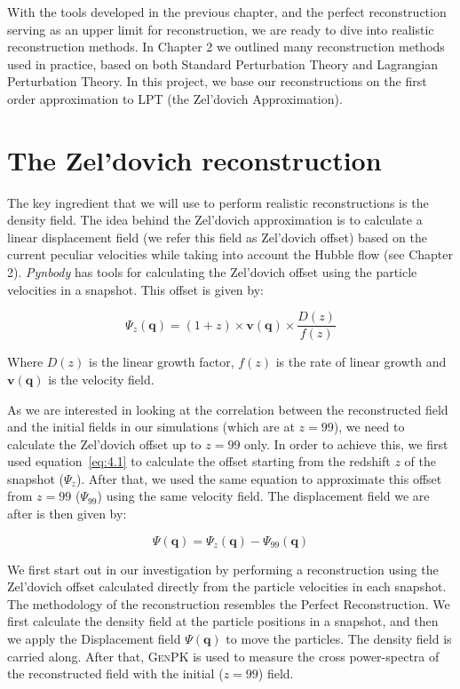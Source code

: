 
With the tools developed in the previous chapter, and the perfect reconstruction serving as an upper limit for reconstruction, we are ready to dive into realistic reconstruction methods. In Chapter 2 we outlined  many reconstruction methods used in practice, based on both Standard Perturbation Theory and Lagrangian Perturbation Theory. In this project, we base our reconstructions on the first order approximation to LPT (the Zel'dovich Approximation).

\section{The Zel'dovich reconstruction}

The key ingredient that we will use to perform realistic reconstructions is the density field. The idea behind the Zel'dovich approximation is to calculate a linear displacement field (we refer this field as Zel'dovich offset) based on the current peculiar velocities while taking into account the Hubble flow (see Chapter 2). \textit{Pynbody} has tools for calculating the Zel'dovich offset using the particle velocities in a snapshot. This offset is given by: 

\begin{equation}
    \Psi_z(\textbf{q}) = (1+z) \times \textbf{v}(\textbf{q}) \times \frac{D(z)}{f(z)}
    \label{eq:4.1}
\end{equation} 

Where $D(z)$ is the linear growth factor, $f(z)$ is the rate of linear growth and $\textbf{v}(\textbf{q})$ is the velocity field. 

As we are interested in looking at the correlation between the reconstructed field  and the initial fields in our simulations (which are at $z=99$), we need to calculate the Zel'dovich offset up to $z=99$ only. In order to achieve this, we first used equation~\ref{eq:4.1} to calculate the offset starting from the redshift $z$ of the snapshot ($\Psi_z$). After that, we used the same equation to approximate this offset from $z=99$ ($\Psi_{99}$) using the same velocity field. The displacement field we are after is then given by:

\begin{equation}
    \Psi(\textbf{q}) = \Psi_z(\textbf{q}) - \Psi_{99}(\textbf{q})
    \label{eq:4.2}
\end{equation}
 
We first start out in our investigation by performing a reconstruction using the Zel'dovich offset calculated directly from the particle velocities in each snapshot. The methodology of the reconstruction resembles the Perfect Reconstruction. We first calculate the density field at the particle positions in a snapshot, and then we apply the Displacement field $\Psi(\textbf{q})$ to move the particles. The density field is carried along. After that, \textsc{GenPK} is used to measure the cross power-spectra of the reconstructed field with the initial ($z=99$) field.


